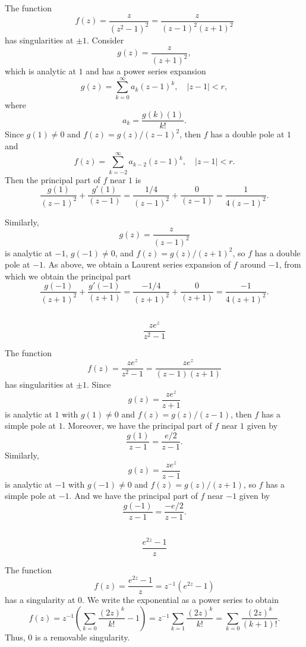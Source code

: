 \documentclass[12pt]{article}
\newenvironment{problem}
    {\begin{lrbox}{\mybox}\begin{minipage}{0.98\textwidth}}
    {\end{minipage}\end{lrbox}\begin{center}\framebox[\textwidth]{\usebox{\mybox}}\end{center}}
\theoremstyle{definition}
\begin{document}
The function
\[ 
    f(z) = \frac{z}{(z^2 - 1)^2} = \frac{z}{(z - 1)^2 (z+1)^2}
\]
has singularities at $\pm1$. Consider
\[
    g(z) = \frac{z}{(z + 1)^2},
\]
which is analytic at $1$ and has a power series expansion
\[
    g(z) = \sum_{k=0}^\infty a_k(z - 1)^k, \quad |z - 1| < r,
\]
where
\[
    a_k = \frac{g(k)(1)}{k!}.
\]
Since $g(1) \ne 0$ and $f(z) = g(z)/(z - 1)^2$, then $f$ has a double pole at $1$ and
\[
    f(z) = \sum_{k = -2}^\infty a_{k-2}(z - 1)^k, \quad |z - 1| < r.
\]
Then the principal part of $f$ near $1$ is
\[
    \frac{g(1)}{(z - 1)^2} + \frac{g'(1)}{(z - 1)}
        = \frac{1/4}{(z - 1)^2} + \frac{0}{(z - 1)}
        = \frac{1}{4(z - 1)^2}.
\]

Similarly,
\[
    g(z) = \frac{z}{(z - 1)^2}
\]
is analytic at $-1$, $g(-1) \ne 0$, and $f(z) = g(z)/(z + 1)^2$, so $f$ has a double pole at $-1$. As above, we obtain a Laurent series expansion of $f$ around $-1$, from which we obtain the principal part
\[
    \frac{g(-1)}{(z + 1)^2} + \frac{g'(-1)}{(z + 1)}
        = \frac{-1/4}{(z + 1)^2} + \frac{0}{(z + 1)}
        = \frac{-1}{4(z + 1)^2}.
\]


\subsection{}
\begin{problem}
    \[
        \frac{z e^z}{z^2 - 1}
    \]
\end{problem}

The function
\[ 
    f(z) = \frac{z e^z}{z^2 - 1} = \frac{z e^z}{(z - 1)(z + 1)}
\]
has singularities at $\pm1$. Since
\[
    g(z) = \frac{z e^z}{z + 1}
\]
is analytic at $1$ with $g(1) \ne 0$ and $f(z) = g(z)/(z - 1)$, then $f$ has a simple pole at $1$. Moreover, we have the principal part of $f$ near $1$ given by
\[
    \frac{g(1)}{z - 1}
        = \frac{e/2}{z - 1}.
\]
Similarly, 
\[
    g(z) = \frac{z e^z}{z - 1}
\]
is analytic at $-1$ with $g(-1) \ne 0$ and $f(z) = g(z)/(z + 1)$, so $f$ has a simple pole at $-1$. And we have the principal part of $f$ near $-1$ given by
\[
    \frac{g(-1)}{z - 1}
        = \frac{-e/2}{z - 1}.
\]

\subsection{}
\begin{problem}
    \[
        \frac{e^{2z} - 1}{z}
    \]
\end{problem}

The function
\[
    f(z) = \frac{e^{2z} - 1}{z} = z^{-1}(e^{2z} - 1)
\]
has a singularity at $0$. We write the exponential as a power series to obtain
\[
    f(z) 
        = z^{-1} \left(\sum_{k=0} \frac{(2z)^k}{k!} - 1\right) 
        = z^{-1}\sum_{k=1} \frac{(2z)^k}{k!} 
        = \sum_{k=0} \frac{(2z)^k}{(k+1)!}. 
\]
Thus, $0$ is a removable singularity.
\end{document}
